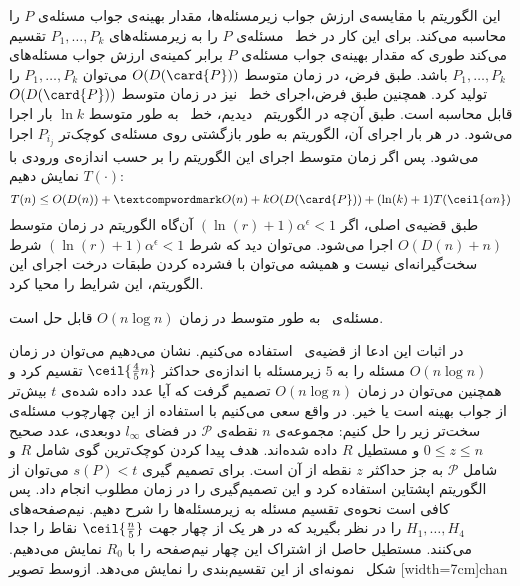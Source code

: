 این الگوریتم با مقایسه‌ی ارزش جواب زیرمسئله‌ها، مقدار بهینه‌ی جواب مسئله‌ی $P$ را محاسبه می‌کند. برای این کار در خط~ مسئله‌ی $P$ را به زیرمسئله‌های $P_1, \ldots, P_k$ تقسیم می‌کند طوری که مقدار بهینه‌ی جواب مسئله‌ی $P$ برابر کمینه‌ی ارزش جواب مسئله‌های $P_1, \ldots, P_k$ باشد. طبق فرض، در زمان متوسط $O(D(\card{P}))$ می‌توان $P_1, \ldots, P_k$ را تولید کرد. همچنین طبق فرض،‌اجرای خط~ نیز در زمان متوسط $O(D(\card{P}))$ قابل محاسبه است. طبق آن‌چه در الگوریتم~ دیدیم، خط~ به طور متوسط $\ln k$ بار اجرا می‌شود. در هر بار اجرای آن، الگوریتم به طور بازگشتی روی مسئله‌ی کوچک‌تر $P_{i_j}$ اجرا می‌شود. پس اگر زمان متوسط اجرای این الگوریتم را بر حسب اندازه‌ی ورودی با $T(\cdot)$ نمایش دهیم:
\[
T(n) \leq O(D(n)) +‌ O(n) + k O(D(\card{P})) + (\ln(k)+1) T(\ceil{\alpha n})
\]
طبق قضیه‌ی اصلی، اگر
$(\ln(r) + 1) \alpha^\epsilon < 1$
آن‌گاه الگوریتم در زمان متوسط
$O(D(n) + n)$
اجرا می‌شود. می‌توان دید که شرط
$(\ln(r) + 1) \alpha^\epsilon < 1$
شرط سخت‌گیرانه‌ای نیست و همیشه می‌توان با فشرده کردن طبقات درخت اجرای این الگوریتم، این شرایط را محیا کرد.


مسئله‌ی~ به طور متوسط در زمان $O(n \log n)$ قابل حل است.

در اثبات این ادعا از قضیه‌ی~ استفاده می‌کنیم. نشان می‌دهیم می‌توان در زمان $O(n \log n)$ مسئله را به $5$ زیرمسئله با اندازه‌ی حداکثر $\ceil{\frac{4}{5} n}$ تقسیم کرد و همچنین می‌توان در زمان $O(n \log n)$ تصمیم گرفت که آیا عدد داده شده‌ی $t$ بیش‌تر از جواب بهینه است یا خیر.
در واقع سعی می‌کنیم با استفاده از این چهارچوب مسئله‌ی سخت‌تر زیر را حل کنیم:
مجموعه‌ی $n$ نقطه‌ی $\mathcal{P}$ در فضای $l_\infty$ دوبعدی، عدد صحیح $0 \leq z \leq n$ و مستطیل $R$ داده شده‌اند. هدف پیدا کردن کوچک‌ترین گوی شامل $R$ و شامل $\mathcal{P}$ به جز حداکثر $z$ نقطه از آن است.
برای تصمیم گیری $s(P) < t$ می‌توان از الگوریتم اپشتاین  استفاده کرد و این تصمیم‌گیری را در زمان مطلوب انجام داد. پس کافی است نحوه‌ی تقسیم مسئله به زیرمسئله‌ها را شرح دهیم. نیم‌صفحه‌های $H_1, \ldots, H_4$ را در نظر بگیرید که در هر یک از چهار جهت $\ceil{\frac{n}{5}}$ نقاط را جدا می‌کنند. مستطیل حاصل از اشتراک این چهار نیم‌صفحه را با $R_0$ نمایش می‌دهیم. شکل~ نمونه‌ای از این تقسیم‌بندی را نمایش می‌دهد.
‌ازوسط
‌تصویر
[width=7cm]{chan}

